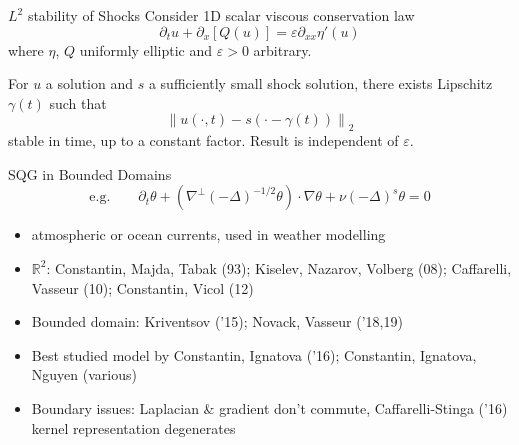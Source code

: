 \documentclass{beamer}
\newcommand{\R}{\mathbb{R}}
\newcommand{\eps}{\varepsilon}
\newcommand{\norm}[1]{\left\lVert#1\right\rVert}
\newcommand{\paren}[1]{\left( #1 \right)}
\newcommand{\del}{\partial}
\newcommand{\grad}{\nabla}
\newcommand{\Laplace}{\Delta}
\begin{document}

\begin{frame}{$L^2$ stability of Shocks}
\pause
Consider 1D scalar viscous conservation law
\[ \del_t u + \del_x[Q(u)] = \eps \del_{xx} \eta'(u) \]
where $\eta$, $Q$ uniformly elliptic and $\eps > 0$ arbitrary.

\begin{theorem}[S. [Submitted{]}]
For $u$ a solution and $s$ a sufficiently small shock solution, there exists Lipschitz $\gamma(t)$ such that
\[ \norm{u(\cdot,t) - s(\cdot-\gamma(t))}_2 \] 
stable in time, up to a constant factor.  Result is independent of $\eps$.  
\end{theorem}
\end{frame}


\begin{frame}{SQG in Bounded Domains}
\pause
\[ \textrm{e.g.} \qquad \del_t \theta + \paren{\grad^\perp (-\Laplace)^{-1/2} \theta} \cdot \grad \theta + \nu (-\Laplace)^s \theta = 0 \]
\begin{itemize}
\item atmospheric or ocean currents, used in weather modelling
\item $\R^2$: Constantin, Majda, Tabak (93); Kiselev, Nazarov, Volberg (08); Caffarelli, Vasseur (10); Constantin, Vicol (12)
\item Bounded domain: Kriventsov ('15); Novack, Vasseur ('18,19)
\item Best studied model by Constantin, Ignatova ('16); Constantin, Ignatova, Nguyen (various)
\item Boundary issues: Laplacian \& gradient don't commute, Caffarelli-Stinga ('16) kernel representation degenerates
\end{itemize}
\end{frame}

\end{document}
